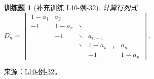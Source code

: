 \documentclass[UTF8,12pt,a4paper,fontset=fandol]{ctexart}
\newtheorem{exercise}{训练题}[section]
\begin{document}
\begin{exercise}[补充训练 L10-例-32]\label{prob:L10-例-32}
计算行列式$D_n=\begin{vmatrix}
            1-a_{1} & a_{2}   &        &           &         \\
            -1      & 1-a_{2} & \ddots &           &         \\
                    & -1      & \ddots & a_{n-1}   &         \\
                    &         & \ddots & 1-a_{n-1} & a_{n}   \\
                    &         &        & -1        & 1-a_{n}
        \end{vmatrix}$.
\end{exercise}
\noindent 来源：\href{https://github.com/yhwu-is/Linear-Algebra-Left-Undone/blob/new/%E8%AE%B2%E4%B9%89/%E4%B8%93%E9%A2%98/10%20%E8%A1%8C%E5%88%97%E5%BC%8F.tex}{L10-例-32}。
\end{document}
